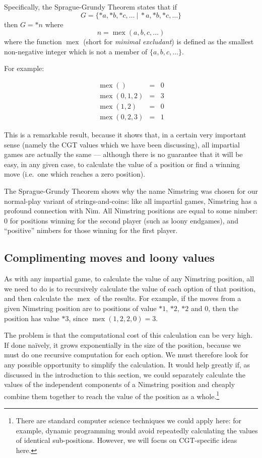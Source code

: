 \documentclass[a4paper,twocolumn]{article}
\DeclareMathOperator{\mex}{mex}
\newcommand{\cgtgame}[2]{\{#1 \:|\: #2\}}
\begin{document}
Specifically, the Sprague-Grundy Theorem states that if $$G =
\cgtgame{*a, *b, *c, \ldots}{*a, *b, *c, \ldots}$$ then $G = *n$
where $$n = \mex(a, b, c, \ldots)$$ where the function $\mex$ (short
for \emph{minimal excludant}) is defined as the smallest non-negative
integer which is not a member of $\{a, b, c, \ldots\}$.

For example:

\begin{eqnarray*}
  \mex() & = & 0 \\
  \mex(0, 1, 2) & = & 3 \\
  \mex(1, 2) & = & 0 \\
  \mex(0, 2, 3) & = & 1
\end{eqnarray*}

This is a remarkable result, because it shows that, in a certain very
important sense (namely the CGT values which we have been discussing),
all impartial games are actually the same --- although there is no
guarantee that it will be easy, in any given case, to calculate the
value of a position or find a winning move (i.e.\ one which reaches a
zero position).

The Sprague-Grundy Theorem shows why the name Nimstring was chosen for
our normal-play variant of strings-and-coins: like all impartial
games, Nimstring has a profound connection with Nim. All Nimstring
positions are equal to some nimber: $0$ for positions winning for the
second player (such as loony endgames), and ``positive'' nimbers for
those winning for the first player.

\subsection{Complimenting moves and loony values}

As with any impartial game, to calculate the value of any Nimstring
position, all we need to do is to recursively calculate the value of
each option of that position, and then calculate the $\mex$ of the
results. For example, if the moves from a given Nimstring position are
to positions of value $*1$, $*2$, $*2$ and $0$, then the position has
value $*3$, since $\mex(1, 2, 2, 0) = 3$.

The problem is that the computational cost of this calculation can be very
high. If done na\"ively, it grows exponentially in the size of the
position, because we must do one recursive computation for each option.
We must therefore look for any possible opportunity to simplify the
calculation. It would help greatly if, as discussed in the introduction
to this section, we could separately calculate the values of the independent
components of a Nimstring position and cheaply combine them together
to reach the value of the position as a whole.\footnote{There are
standard computer science techniques we could apply here: for example,
dynamic programming would avoid repeatedly calculating the values of
identical sub-positions. However, we will focus on CGT-specific ideas here.}
\end{document}
